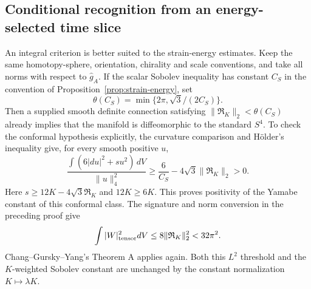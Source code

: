 \documentclass[11pt]{article}
\numberwithin{equation}{section}
\theoremstyle{definition}
\theoremstyle{remark}
\begin{document}
\subsection{Conditional recognition from an energy-selected time slice}
\label{subsec:finite-time-sphere}

An integral criterion is better suited to the strain-energy estimates.
Keep the same homotopy-sphere, orientation, chirality and scale
conventions, and take all norms with respect to $\widehat g_A$.
If the scalar Sobolev inequality has constant $C_S$ in the convention
of Proposition~\ref{prop:strain-energy}, set
\[
 \theta(C_S)=\min\{2\pi,\sqrt3/(2C_S)\}.
\]
Then a supplied smooth definite connection satisfying
$\|\mathfrak R_K\|_2<\theta(C_S)$ already implies that the
manifold is diffeomorphic to the standard $S^4$.
To check the conformal hypothesis explicitly, the curvature comparison
and H\"older's inequality give, for every smooth positive $u$,
\[
 \frac{\int(6|du|^2+su^2)\,dV}{\|u\|_4^2}
 \geq \frac6{C_S}-4\sqrt3\|\mathfrak R_K\|_2>0.
\]
Here $s\ge12K-4\sqrt3\mathfrak R_K$ and $12K\ge6K$.
This proves positivity of the Yamabe constant of this conformal class.
The signature and norm conversion in the preceding proof give
\[
 \int|W|_{\rm tensor}^2dV
 \leq8\|\mathfrak R_K\|_2^2<32\pi^2.
\]
Chang--Gursky--Yang's Theorem A applies again. Both this
$L^2$ threshold and the $K$-weighted Sobolev constant are unchanged
by the constant normalization $K\mapsto\lambda K$.
\end{document}
